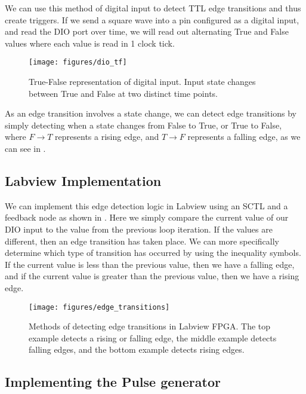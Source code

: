 We can use this method of digital input to detect TTL edge transitions and thus create triggers.  If we send a square wave into a pin configured as a digital input, and read the DIO port over time, we will read out alternating True and False values  where each value is read in 1 clock tick.  
 
\begin{figure}[!ht] 
 \centering 
 \texttt{[image: figures/dio\_tf]} 
 \caption[Digital Input Representation]{True-False representation of digital input.  Input state changes between True and False at two distinct time points.} 
 \label{fig:dio_tf} 
\end{figure}

As an edge transition involves a state change, we can detect edge transitions
by simply detecting when a state changes from False to True, or True to False,
where $F \to T$ represents a rising edge, and $T \to F$ represents a falling
edge, as we can see in .  

\subsection{Labview Implementation} 

We can implement this edge detection logic in Labview using an SCTL and a
feedback node as shown in .  Here we simply compare the current value of our DIO input to the value from the previous loop iteration.  If the values are different, then an edge transition has taken place.  We can more specifically determine which type of transition has occurred by using the inequality symbols.  If the current value is less than the previous value, then we have a falling edge, and if the current value is greater than the previous value, then we have a rising edge.

\begin{figure}[!ht] 
 \centering 
 \texttt{[image: figures/edge\_transitions]} 
 \caption[Edge Transitions in Labview]{Methods of detecting edge transitions in Labview FPGA.  The top example detects a rising or falling edge, the middle example detects falling edges, and the bottom example detects rising edges.} 
 \label{fig:edge_transitions} 
\end{figure} 


\subsection{Implementing the Pulse generator}


